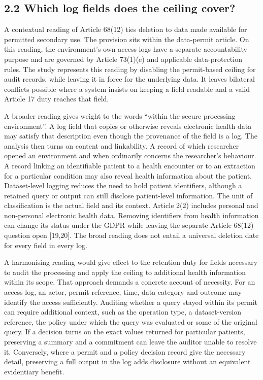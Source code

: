 \documentclass[5p,twocolumn]{elsarticle}
\begin{document}
\hypertarget{which-log-fields-does-the-ceiling-cover}{%
\subsection{2.2 Which log fields does the ceiling
cover?}\label{which-log-fields-does-the-ceiling-cover}}

A contextual reading of Article 68(12) ties deletion to data made
available for permitted secondary use. The provision sits within the
data-permit article. On this reading, the environment's own access logs
have a separate accountability purpose and are governed by Article
73(1)(e) and applicable data-protection rules. The study represents this
reading by disabling the permit-based ceiling for audit records, while
leaving it in force for the underlying data. It leaves bilateral
conflicts possible where a system insists on keeping a field readable
and a valid Article 17 duty reaches that field.

A broader reading gives weight to the words ``within the secure
processing environment''. A log field that copies or otherwise reveals
electronic health data may satisfy that description even though the
provenance of the field is a log. The analysis then turns on content and
linkability. A record of which researcher opened an environment and when
ordinarily concerns the researcher's behaviour. A record linking an
identifiable patient to a health encounter or to an extraction for a
particular condition may also reveal health information about the
patient. Dataset-level logging reduces the need to hold patient
identifiers, although a retained query or output can still disclose
patient-level information. The unit of classification is the actual
field and its context. Article 2(2) includes personal and non-personal
electronic health data. Removing identifiers from health information can
change its status under the GDPR while leaving the separate Article
68(12) question open {[}19,20{]}. The broad reading does not entail a
universal deletion date for every field in every log.

A harmonising reading would give effect to the retention duty for fields
necessary to audit the processing and apply the ceiling to additional
health information within its scope. That approach demands a concrete
account of necessity. For an access log, an actor, permit reference,
time, data category and outcome may identify the access sufficiently.
Auditing whether a query stayed within its permit can require additional
context, such as the operation type, a dataset-version reference, the
policy under which the query was evaluated or some of the original
query. If a decision turns on the exact values returned for particular
patients, preserving a summary and a commitment can leave the auditor
unable to resolve it. Conversely, where a permit and a policy decision
record give the necessary detail, preserving a full output in the log
adds disclosure without an equivalent evidentiary benefit.
\end{document}
